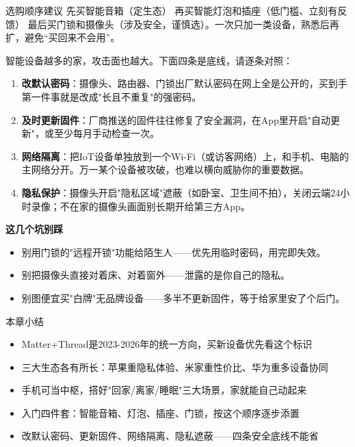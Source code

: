 \begin{tcbinfo}{选购顺序建议}
先买智能音箱（定生态） 再买智能灯泡和插座（低门槛、立刻有反馈） 最后买门锁和摄像头（涉及安全，谨慎选）。一次只加一类设备，熟悉后再扩，避免“买回来不会用”。

\end{tcbinfo}


智能设备越多的家，攻击面也越大。下面四条是底线，请逐条对照：

\begin{enumerate}
  \item \textbf{改默认密码}：摄像头、路由器、门锁出厂默认密码在网上全是公开的，买到手第一件事就是改成"长且不重复"的强密码。
  \item \textbf{及时更新固件}：厂商推送的固件往往修复了安全漏洞，在App里开启"自动更新"，或至少每月手动检查一次。
  \item \textbf{网络隔离}：把IoT设备单独放到一个Wi-Fi（或访客网络）上，和手机、电脑的主网络分开。万一某个设备被攻破，也难以横向威胁你的重要数据。
  \item \textbf{隐私保护}：摄像头开启"隐私区域"遮蔽（如卧室、卫生间不拍），关闭云端24小时录像；不在家的摄像头画面别长期开给第三方App。
\end{enumerate}

\textbf{这几个坑别踩}\par

\begin{itemize}
  \item 别用门锁的"远程开锁"功能给陌生人——优先用临时密码，用完即失效。
  \item 别把摄像头直接对着床、对着窗外——泄露的是你自己的隐私。
  \item 别图便宜买"白牌"无品牌设备——多半不更新固件，等于给家里安了个后门。
\end{itemize}

\begin{tcbsummary}{本章小结}
\begin{itemize}
  \item Matter+Thread是2023-2026年的统一方向，买新设备优先看这个标识
  \item 三大生态各有所长：苹果重隐私体验、米家重性价比、华为重多设备协同
  \item 手机可当中枢，搭好"回家/离家/睡眠"三大场景，家就能自己动起来
  \item 入门四件套：智能音箱、灯泡、插座、门锁，按这个顺序逐步添置
  \item 改默认密码、更新固件、网络隔离、隐私遮蔽——四条安全底线不能省
\end{itemize}

\end{tcbsummary}
